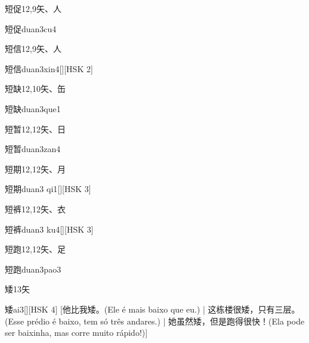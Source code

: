 \begin{entry}{短促}{12,9}{⽮、⼈}
  \begin{phonetics}{短促}{duan3cu4}
  \end{phonetics}
\end{entry}

\begin{entry}{短信}{12,9}{⽮、⼈}
  \begin{phonetics}{短信}{duan3xin4}[][HSK 2]
  \end{phonetics}
\end{entry}

\begin{entry}{短缺}{12,10}{⽮、⽸}
  \begin{phonetics}{短缺}{duan3que1}
  \end{phonetics}
\end{entry}

\begin{entry}{短暂}{12,12}{⽮、⽇}
  \begin{phonetics}{短暂}{duan3zan4}
  \end{phonetics}
\end{entry}

\begin{entry}{短期}{12,12}{⽮、⽉}
  \begin{phonetics}{短期}{duan3 qi1}[][HSK 3]
  \end{phonetics}
\end{entry}

\begin{entry}{短裤}{12,12}{⽮、⾐}
  \begin{phonetics}{短裤}{duan3 ku4}[][HSK 3]
  \end{phonetics}
\end{entry}

\begin{entry}{短跑}{12,12}{⽮、⾜}
  \begin{phonetics}{短跑}{duan3pao3}
  \end{phonetics}
\end{entry}

\begin{entry}{矮}{13}{⽮}
  \begin{phonetics}{矮}{ai3}[][HSK 4]
    [他比我矮。(Ele é mais baixo que eu.) | 这栋楼很矮，只有三层。(Esse prédio é baixo, tem só três andares.) | 她虽然矮，但是跑得很快！(Ela pode ser baixinha, mas corre muito rápido!)]
  \end{phonetics}
\end{entry}

